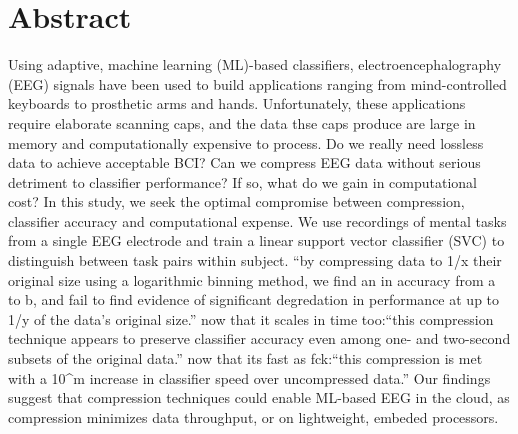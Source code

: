 
\section{Abstract}

Using adaptive, machine learning (ML)-based classifiers, electroencephalography (EEG) signals have been used to build applications ranging from mind-controlled keyboards to prosthetic arms and hands. Unfortunately, these applications require elaborate scanning caps, and the data thse caps produce are large in memory and computationally expensive to process. Do we really need lossless data to achieve acceptable BCI? Can we compress EEG data without serious detriment to classifier performance? If so, what do we gain in computational cost? In this study, we seek the optimal compromise between compression, classifier accuracy and computational expense. We use recordings of mental tasks from a single EEG electrode and train a linear support vector classifier (SVC) to distinguish between task pairs within subject. ``by compressing data to 1/x their original size using a logarithmic binning method, we find an  in accuracy from a to b, and fail to find evidence of significant degredation in performance at up to 1/y of the data's original size.''  now that it scales in time too:``this compression technique appears to preserve classifier accuracy even among one- and two-second subsets of the original data.'' now that its fast as fck:``this compression is met with a 10^m increase in classifier speed over uncompressed data.''  Our findings suggest that compression techniques could enable ML-based EEG in the cloud, as compression minimizes data throughput, or on lightweight, embeded processors.